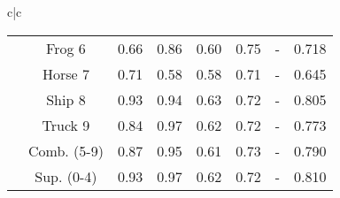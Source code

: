 \documentclass[acmtog, nonacm]{acmart}
\begin{document}
\begin{tabular}{c|c}
\begin{tabular}{@{}c|c|ccccc|c@{}}
                       & Frog   6                  & 0.66  & 0.86 & 0.60 & 0.75 & -    & 0.718                \\
                       & Horse 7                   & 0.71  & 0.58 & 0.58 & 0.71 & -    & 0.645                \\
                       & Ship   8                  & 0.93  & 0.94 & 0.63 & 0.72 & -    & 0.805                \\
                       & Truck 9                   & 0.84  & 0.97 & 0.62 & 0.72 & -    & 0.773                \\
                       & Comb. (5-9)               & 0.87  & 0.95 & 0.61 & 0.73 & -    & 0.790                \\
                       & Sup. (0-4)                & 0.93  & 0.97 & 0.62 & 0.72 & -    & 0.810               \\
\midrule
\end{tabular}
     

\end{tabular}
\end{document}
